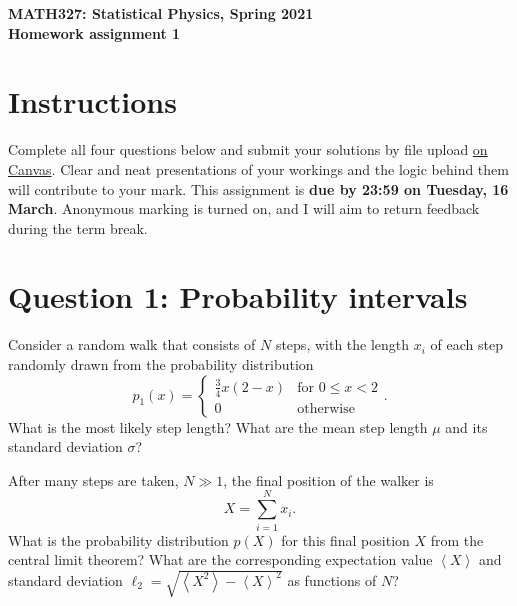 \documentclass[12 pt]{article} %
\newcommand{\si}{\ensuremath{\sigma} }
\newcommand{\vev}[1]{\ensuremath{\left\langle #1 \right\rangle} }
\newcommand{\showmarks}[1]{\rightline{\texttt{[#1 marks]}}} %
\begin{document}
\newcommand{\thisweek}{MATH327 Homework 1}
\newcommand{\moddate}{Last modified 5 Mar.~2021}
\begin{center}
  {\Large \textbf{MATH327: Statistical Physics, Spring 2021}} \\[12 pt]
  {\Large \textbf{Homework assignment 1}} \\[24 pt]
\end{center}

\section*{Instructions}
Complete all four questions below and submit your solutions by file upload \href{https://liverpool.instructure.com/courses/19478/assignments/89667}{on Canvas}.
Clear and neat presentations of your workings and the logic behind them will contribute to your mark.
This assignment is \textbf{due by 23:59 on Tuesday, 16 March}.
Anonymous marking is turned on, and I will aim to return feedback during the term break.



\section*{Question 1: Probability intervals}
Consider a random walk that consists of $N$ steps, with the length $x_i$ of each step randomly drawn from the probability distribution
\begin{equation*}
  p_1(x) = \left\{\begin{array}{ll}\frac{3}{4} x (2 - x) & \mbox{for } 0 \leq x < 2 \\
                                   0                     & \mbox{otherwise}\end{array}\right. .
\end{equation*}
What is the most likely step length?
What are the mean step length $\mu$ and its standard deviation $\si$?

\showmarks{3}

After many steps are taken, $N \gg 1$, the final position of the walker is
\begin{equation*}
  X = \sum_{i = 1}^N x_i.
\end{equation*}
What is the probability distribution $p(X)$ for this final position $X$ from the central limit theorem?
What are the corresponding expectation value $\vev{X}$ and standard deviation $\ell_2 = \sqrt{\vev{X^2} - \vev{X}^2}$ as functions of $N$?
\end{document}
